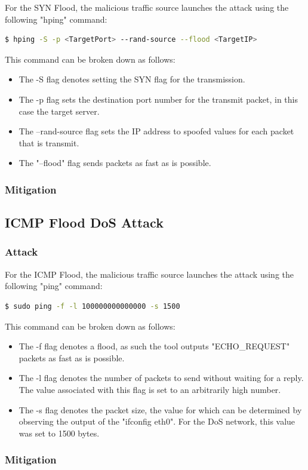 For the SYN Flood, the malicious traffic source launches the attack using the
following "hping" command:

\begin{lstlisting}[language=bash, caption=SYN Flood DoS Command]
$ hping -S -p <TargetPort> --rand-source --flood <TargetIP>
\end{lstlisting}

This command can be broken down as follows:

\begin{itemize}
	\item The -S flag denotes setting the SYN flag for the transmission.
	\item The -p flag sets the destination port number for the transmit
		packet, in this case the target server.
	\item The --rand-source flag sets the IP address to spoofed values for
		each packet that is transmit.
	\item The "--flood" flag sends packets as fast as is possible.

\end{itemize}


\subsubsection{Mitigation}

\subsection {ICMP Flood DoS Attack}

\subsubsection{Attack}

For the ICMP Flood, the malicious traffic source launches the attack using the
following "ping" command:

\begin{lstlisting}[language=bash, caption=ICMP Flood DoS Command]
$ sudo ping -f -l 100000000000000 -s 1500
\end{lstlisting}

This command can be broken down as follows:

\begin{itemize}
	\item The -f flag denotes a flood, as such the tool outputs
		"ECHO\_REQUEST" packets as fast as is possible.
	\item The -l flag denotes the number of packets to send without waiting
		for a reply. The value associated with this flag is set to an
		arbitrarily high number.
	\item The -s flag denotes the packet size, the value for which can be
		determined by observing the output of the "ifconfig eth0". For
		the DoS network, this value was set to 1500 bytes.
\end{itemize}

\subsubsection{Mitigation}
